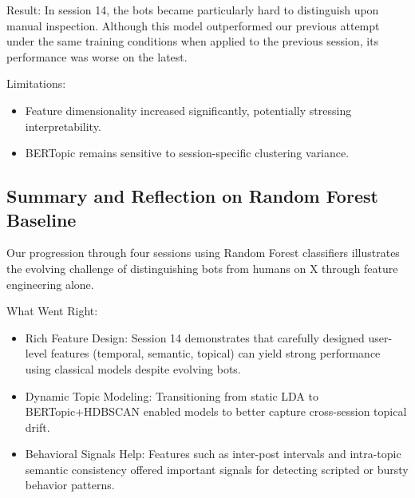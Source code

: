 \documentclass[conference]{IEEEtran}
\begin{document}
Result:
In session 14, the bots became particularly hard to distinguish upon 
manual inspection. Although this model outperformed our previous attempt under the same training conditions
when applied to the previous session, its performance was worse on the latest.

Limitations:
\begin{itemize}
    \item Feature dimensionality increased significantly, potentially stressing interpretability.
    
    \item BERTopic remains sensitive to session-specific clustering variance.
\end{itemize}

\subsection{Summary and Reflection on Random Forest Baseline}
Our progression through four sessions using Random Forest classifiers illustrates the evolving challenge of distinguishing bots from humans on X through feature engineering alone.

What Went Right:
\begin{itemize}
    \item Rich Feature Design: Session 14 demonstrates that carefully designed user-level features (temporal, semantic, topical) can yield strong performance using classical models despite evolving bots.
    
    \item Dynamic Topic Modeling: Transitioning from static LDA to BERTopic+HDBSCAN enabled models to better capture cross-session topical drift.
    
    \item Behavioral Signals Help: Features such as inter-post intervals and intra-topic semantic consistency offered important signals for detecting scripted or bursty behavior patterns.
\end{itemize}
\end{document}
